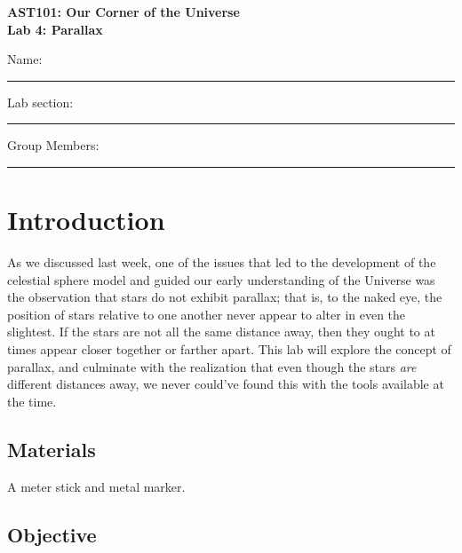 \documentclass[11pt]{article}
\begin{document}
\begin{center}
\textbf{\Large
AST101: Our Corner of the Universe \\
\vspace*{0.1cm}
Lab 4: Parallax
}
\end{center}

\vspace*{0.5cm}

{\Large Name:}\vspace*{0.5cm}\\\hrule
{\Large Lab section:}\vspace*{0.5cm}\\\hrule
{\Large Group Members:}\vspace*{0.5cm}\\\hrule
\vspace*{0.5cm}

\section{Introduction}

As we discussed last week, one of the issues that led to the development of the celestial sphere model and guided our early understanding of the Universe was the observation that stars do not exhibit parallax; that is, to the naked eye, the position of stars relative to one another never appear to alter in even the slightest. If the stars are not all the same distance away, then they ought to at times appear closer together or farther apart. This lab will explore the concept of parallax, and culminate with the realization that even though the stars {\it are} different distances away, we never could've found this with the tools available at the time. 

\subsection*{Materials}

A meter stick and metal marker.

\subsection*{Objective}
\end{document}
